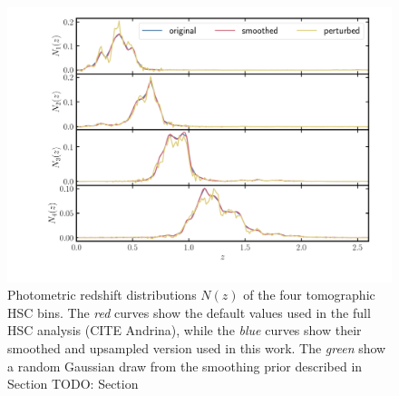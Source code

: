 \documentclass[a4paper,11pt]{article}
\begin{document}
\begin{figure}[ht]
\centering  
\includegraphics[width=1.\textwidth]{./Nzs}
\caption{Photometric redshift
distributions $N(z)$
of the four tomographic HSC bins.
The \textit{red} curves show the
default values used in the 
full HSC analysis (CITE Andrina),
while the \textit{blue} curves 
show their smoothed and upsampled 
version used in this work. The
\textit{green} show a random 
Gaussian draw from the smoothing 
prior described in Section TODO: Section}
\label{fig:Nzs}
\end{figure}
\end{document}
